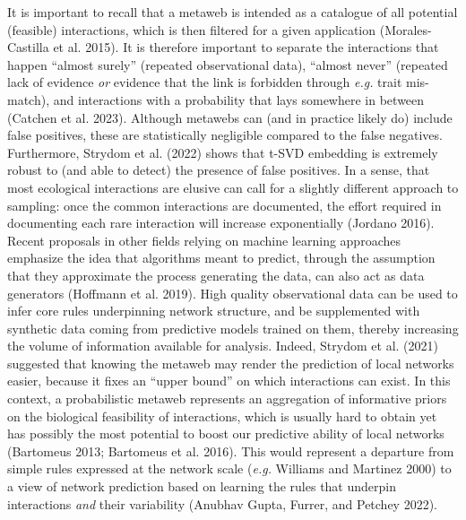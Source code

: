 \documentclass[
  letterpaper,
  DIV=11,
  numbers=noendperiod]{scrartcl}
\begin{document}
It is important to recall that a metaweb is intended as a catalogue of
all potential (feasible) interactions, which is then filtered for a
given application (Morales-Castilla et al. 2015). It is therefore
important to separate the interactions that happen ``almost surely''
(repeated observational data), ``almost never'' (repeated lack of
evidence \emph{or} evidence that the link is forbidden through
\emph{e.g.} trait mis-match), and interactions with a probability that
lays somewhere in between (Catchen et al. 2023). Although metawebs can
(and in practice likely do) include false positives, these are
statistically negligible compared to the false negatives. Furthermore,
Strydom et al. (2022) shows that t-SVD embedding is extremely robust to
(and able to detect) the presence of false positives. In a sense, that
most ecological interactions are elusive can call for a slightly
different approach to sampling: once the common interactions are
documented, the effort required in documenting each rare interaction
will increase exponentially (Jordano 2016). Recent proposals in other
fields relying on machine learning approaches emphasize the idea that
algorithms meant to predict, through the assumption that they
approximate the process generating the data, can also act as data
generators (Hoffmann et al. 2019). High quality observational data can
be used to infer core rules underpinning network structure, and be
supplemented with synthetic data coming from predictive models trained
on them, thereby increasing the volume of information available for
analysis. Indeed, Strydom et al. (2021) suggested that knowing the
metaweb may render the prediction of local networks easier, because it
fixes an ``upper bound'' on which interactions can exist. In this
context, a probabilistic metaweb represents an aggregation of
informative priors on the biological feasibility of interactions, which
is usually hard to obtain yet has possibly the most potential to boost
our predictive ability of local networks (Bartomeus 2013; Bartomeus et
al. 2016). This would represent a departure from simple rules expressed
at the network scale (\emph{e.g.} Williams and Martinez 2000) to a view
of network prediction based on learning the rules that underpin
interactions \emph{and} their variability (Anubhav Gupta, Furrer, and
Petchey 2022).
\end{document}
